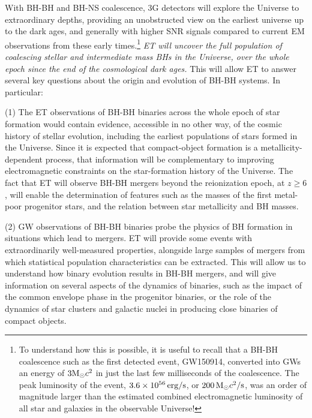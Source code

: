 With BH-BH and BH-NS coalescence, 3G detectors will explore the Universe to extraordinary depths, providing  an unobstructed view on the earliest universe up to the dark ages, and generally with higher SNR signals compared to current EM observations from these early times.\footnote{To understand how this is possible, it is useful to recall that a BH-BH coalescence such as the first  detected event, GW150914, converted  into GWs an energy of  $3 \mathrm{M}_{\odot} c^2$  in just the last few milliseconds of the coalescence. The peak luminosity of the event,  $3.6\times 10^{56}\, {\rm erg/s}$, or  $200\, \mathrm{M}_{\odot} c^2/{\rm s}$, was an order of magnitude  larger than the estimated combined electromagnetic luminosity of all star and galaxies in the observable Universe!} {\em ET will uncover the  full population of coalescing stellar and intermediate mass BHs in the Universe,
over the whole epoch since the end of the cosmological dark ages.}
This will allow ET to answer several key questions about the origin and evolution of BH-BH systems. In particular:

\vspace{1mm}\noindent
(1) The ET  observations of BH-BH binaries  across the whole epoch of star formation would contain evidence,  accessible in no other way, of the cosmic history of stellar evolution, including the earliest populations of stars formed in the Universe.   
Since it is expected that compact-object formation is a metallicity-dependent process, that information will be complementary to improving electromagnetic constraints on the star-formation history of the Universe.  The fact that ET  will observe BH-BH mergers beyond the reionization epoch, at $z \ge 6$, will enable the determination of features such as the masses of the first metal-poor progenitor stars, and the relation between star metallicity and BH masses. 

\vspace{1mm}\noindent
(2) GW observations of BH-BH binaries probe the physics of BH formation in situations which lead to mergers.  ET will provide some events with extraordinarily well-measured properties, alongside large samples of mergers from which statistical population characteristics can be extracted.   
This will allow us to understand how binary evolution results in BH-BH mergers, and will give information on several aspects of the dynamics of binaries, such as the impact of the common envelope phase in the progenitor binaries, or the role of the dynamics of star clusters and galactic nuclei in producing close binaries of compact objects. 
   
